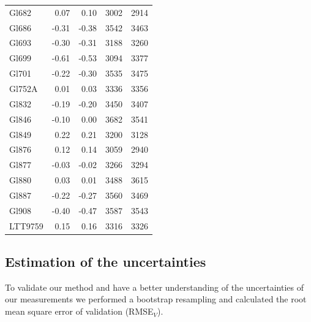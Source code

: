 \documentclass[referee]{aa}
\begin{document}
\begin{table}[]
{\begin{tabular}{ l r r r r}
Gl682 & 0.07 & 0.10 & 3002 & 2914 \\
Gl686 & -0.31 & -0.38 & 3542 & 3463 \\
Gl693 & -0.30 & -0.31 & 3188 & 3260 \\
Gl699 & -0.61 & -0.53 & 3094 & 3377 \\
Gl701 & -0.22 & -0.30 & 3535 & 3475 \\
Gl752A & 0.01 & 0.03 & 3336 & 3356 \\
Gl832 & -0.19 & -0.20 & 3450 & 3407 \\
Gl846 & -0.10 & 0.00 & 3682 & 3541 \\
Gl849 & 0.22 & 0.21 & 3200 & 3128 \\
Gl876 & 0.12 & 0.14 & 3059 & 2940 \\
Gl877 & -0.03 & -0.02 & 3266 & 3294 \\
Gl880 & 0.03 & 0.01 & 3488 & 3615 \\
Gl887 & -0.22 & -0.27 & 3560 & 3469 \\
Gl908 & -0.40 & -0.47 & 3587 & 3543 \\
LTT9759 & 0.15 & 0.16 & 3316 & 3326 \\
\hline
\end{tabular}}
\end{table}















\subsection{Estimation of the uncertainties}
\label{sec:uncertain}
To validate our method and have a better understanding of the uncertainties of our measurements we performed a bootstrap resampling and calculated the root mean square error of validation (RMSE$_{V}$). 
\end{document}
